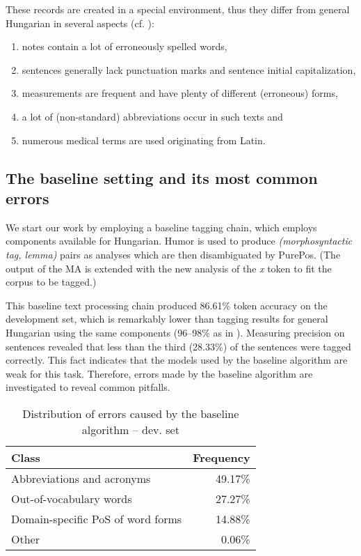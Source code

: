 These records are created in a special environment, thus they differ from general Hungarian in several aspects (cf. \cite{Orosz2013a,Siklosi2013b,Siklosi2012}):

\begin{enumerate} %
 \item notes contain a lot of erroneously spelled words,
 \item sentences generally lack punctuation marks and sentence initial capitalization, 
 \item measurements are frequent and have plenty of different (erroneous) forms,
 \item a lot of (non-standard) abbreviations occur in such texts and
 \item numerous medical terms are used originating from Latin.
\end{enumerate}

\subsection{The baseline setting and its most common errors}
\label{sec:baseline}

We start our work by employing a baseline tagging chain, which employs components available for Hungarian. 
Humor is used to produce \emph{(morphosyntactic tag, lemma)} pairs as analyses which are then disambiguated by PurePos. 
(The output of the MA is extended with the new analysis of the \textit{x} token to fit the corpus to be tagged.)

This baseline text processing chain produced 86.61\% token accuracy on the development set, which is remarkably lower than tagging results for general Hungarian using the same components (96--98\% as in \cite{Orosz2013b,zsibrata2013magyarlanc}). 
Measuring precision on sentences revealed that less than the third (28.33\%) of the sentences were tagged correctly. 
This fact indicates that the models used by the baseline algorithm are weak for this task. 
Therefore, errors made by the baseline algorithm are investigated to reveal common pitfalls. 

\begin{table}[H]
\centering
\caption{Distribution of errors caused by the baseline algorithm -- dev. set}
\label{tab:error_types}
\begin{tabular}{ l r } 
\hline
Class & Frequency  \\
\hline
Abbreviations and acronyms & 49.17\% \\
Out-of-vocabulary words & 27.27\% \\
Domain-specific PoS of word forms & 14.88\% \\
Other & 0.06\% \\
\hline
\end{tabular}
\end{table}

